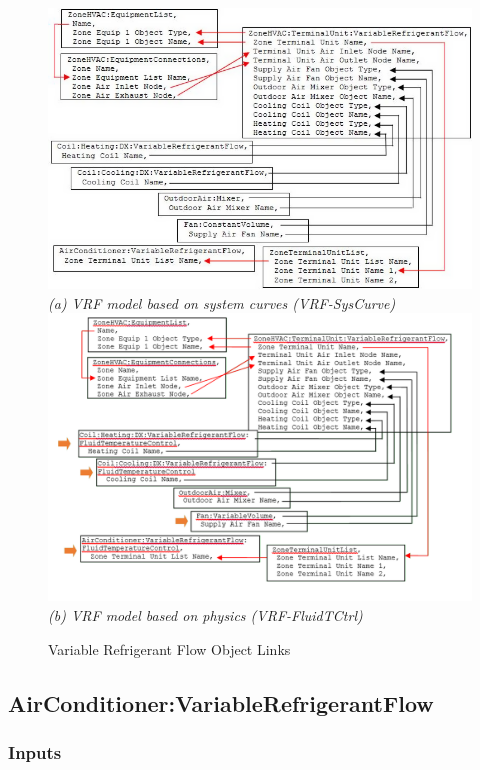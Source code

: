 \begin{figure}[hbtp]
\centering
\includegraphics{media/image311.png}
\emph{(a) VRF model based on system curves (VRF-SysCurve)}
\includegraphics{media/image312.png}
\emph{(b) VRF model based on physics (VRF-FluidTCtrl)}
\caption{Variable Refrigerant Flow Object Links \protect \label{fig:variable-refrigerant-flow-object-links}}
\end{figure}

\subsection{AirConditioner:VariableRefrigerantFlow}\label{airconditionervariablerefrigerantflow}
\subsubsection{Inputs}\label{inputs-051}

